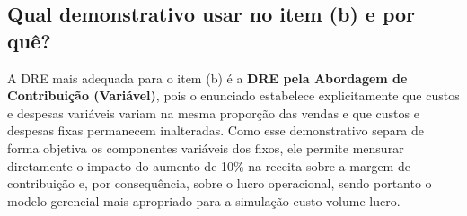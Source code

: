 \documentclass[12pt]{article}
\begin{document}
\subsection{Qual demonstrativo usar no item (b) e por quê?}
\label{sec:org16a58fb}
A DRE mais adequada para o item (b) é a \textbf{DRE pela Abordagem de Contribuição (Variável)}, pois o
enunciado estabelece explicitamente que custos e despesas variáveis variam na mesma proporção
das vendas e que custos e despesas fixas permanecem inalteradas. Como esse demonstrativo
separa de forma objetiva os componentes variáveis dos fixos, ele permite mensurar diretamente
o impacto do aumento de 10\% na receita sobre a margem de contribuição e, por consequência,
sobre o lucro operacional, sendo portanto o modelo gerencial mais apropriado para a simulação
custo-volume-lucro.
\end{document}

